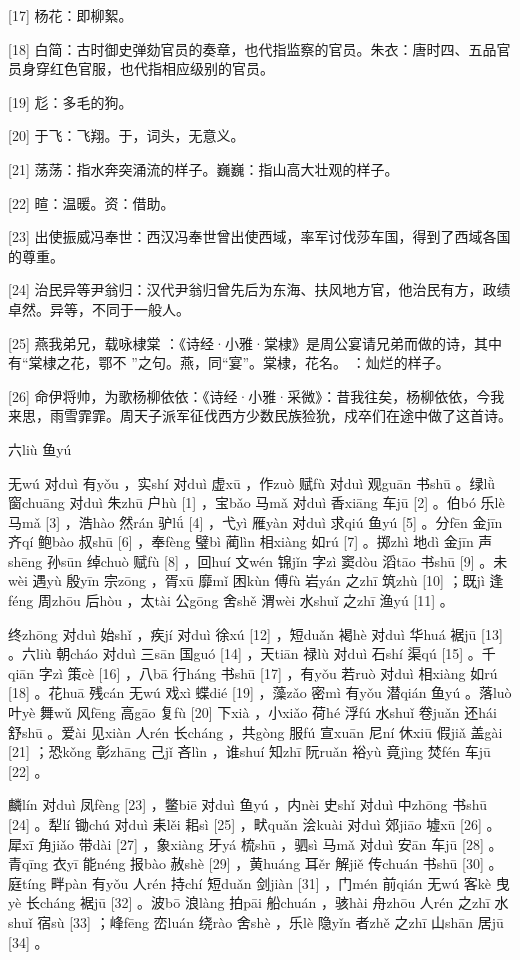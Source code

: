 \documentclass[12pt,UTF8]{ctexbook}
\begin{document}
[17] 杨花：即柳絮。

[18] 白简：古时御史弹劾官员的奏章，也代指监察的官员。朱衣：唐时四、五品官员身穿红色官服，也代指相应级别的官员。

[19] 尨：多毛的狗。

[20] 于飞：飞翔。于，词头，无意义。

[21] 荡荡：指水奔突涌流的样子。巍巍：指山高大壮观的样子。

[22] 暄：温暖。资：借助。

[23] 出使振威冯奉世：西汉冯奉世曾出使西域，率军讨伐莎车国，得到了西域各国的尊重。

[24] 治民异等尹翁归：汉代尹翁归曾先后为东海、扶风地方官，他治民有方，政绩卓然。异等，不同于一般人。

[25] 燕我弟兄，载咏棣棠 ：《诗经·小雅·棠棣》是周公宴请兄弟而做的诗，其中有“棠棣之花，鄂不 ”之句。燕，同“宴”。棠棣，花名。 ：灿烂的样子。

[26] 命伊将帅，为歌杨柳依依：《诗经·小雅·采微》：昔我往矣，杨柳依依，今我来思，雨雪霏霏。周天子派军征伐西方少数民族猃狁，戍卒们在途中做了这首诗。





六liù 鱼yú


无wú 对duì 有yǒu ，实shí 对duì 虚xū ，作zuò 赋fù 对duì 观guān 书shū 。绿lǜ 窗chuāng 对duì 朱zhū 户hù [1] ，宝bǎo 马mǎ 对duì 香xiāng 车jū [2] 。伯bó 乐lè 马mǎ [3] ，浩hào 然rán 驴lǘ [4] ，弋yì 雁yàn 对duì 求qiú 鱼yú [5] 。分fēn 金jīn 齐qí 鲍bào 叔shū [6] ，奉fèng 璧bì 蔺lìn 相xiàng 如rú [7] 。掷zhì 地dì 金jīn 声shēng 孙sūn 绰chuò 赋fù [8] ，回huí 文wén 锦jǐn 字zì 窦dòu 滔tāo 书shū [9] 。未wèi 遇yù 殷yīn 宗zōng ，胥xū 靡mǐ 困kùn 傅fù 岩yán 之zhī 筑zhù [10] ；既jì 逢féng 周zhōu 后hòu ，太tài 公gōng 舍shě 渭wèi 水shuǐ 之zhī 渔yú [11] 。

终zhōng 对duì 始shǐ ，疾jí 对duì 徐xú [12] ，短duǎn 褐hè 对duì 华huá 裾jū [13] 。六liù 朝cháo 对duì 三sān 国guó [14] ，天tiān 禄lù 对duì 石shí 渠qú [15] 。千qiān 字zì 策cè [16] ，八bā 行háng 书shū [17] ，有yǒu 若ruò 对duì 相xiàng 如rú [18] 。花huā 残cán 无wú 戏xì 蝶dié [19] ，藻zǎo 密mì 有yǒu 潜qián 鱼yú 。落luò 叶yè 舞wǔ 风fēng 高gāo 复fù [20] 下xià ，小xiǎo 荷hé 浮fú 水shuǐ 卷juǎn 还hái 舒shū 。爱ài 见xiàn 人rén 长cháng ，共gòng 服fú 宣xuān 尼ní 休xiū 假jiǎ 盖gài [21] ；恐kǒng 彰zhāng 己jǐ 吝lìn ，谁shuí 知zhī 阮ruǎn 裕yù 竟jìng 焚fén 车jū [22] 。

麟lín 对duì 凤fèng [23] ，鳖biē 对duì 鱼yú ，内nèi 史shǐ 对duì 中zhōng 书shū [24] 。犁lí 锄chú 对duì 耒lěi 耜sì [25] ，畎quǎn 浍kuài 对duì 郊jiāo 墟xū [26] 。犀xī 角jiǎo 带dài [27] ，象xiàng 牙yá 梳shū ，驷sì 马mǎ 对duì 安ān 车jū [28] 。青qīng 衣yī 能néng 报bào 赦shè [29] ，黄huáng 耳ěr 解jiě 传chuán 书shū [30] 。庭tíng 畔pàn 有yǒu 人rén 持chí 短duǎn 剑jiàn [31] ，门mén 前qián 无wú 客kè 曳yè 长cháng 裾jū [32] 。波bō 浪làng 拍pāi 船chuán ，骇hài 舟zhōu 人rén 之zhī 水shuǐ 宿sù [33] ；峰fēng 峦luán 绕rào 舍shè ，乐lè 隐yǐn 者zhě 之zhī 山shān 居jū [34] 。
\end{document}
